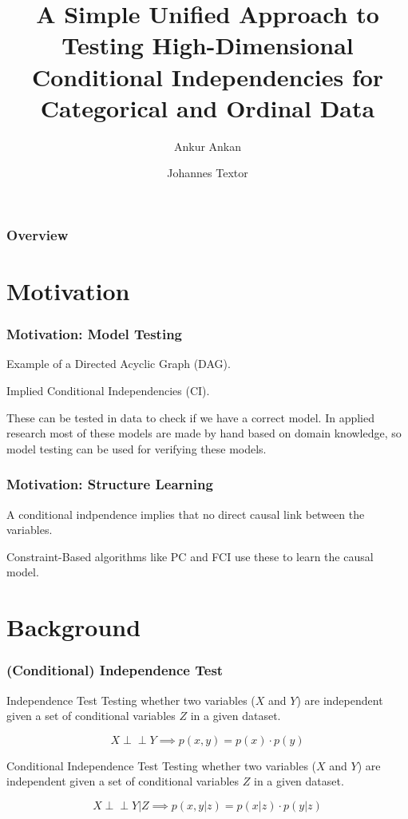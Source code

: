 \documentclass{beamer}
\def\ci{\perp\!\!\!\!\!\perp}
\begin{document}
\title{A Simple Unified Approach to Testing High-Dimensional Conditional
Independencies for Categorical and Ordinal Data}
\author {Ankur Ankan \and Johannes Textor}
\date{}
\maketitle

\begin{frame}
	\frametitle{Overview}
	\tableofcontents
\end{frame}

\section{Motivation}
\begin{frame}
	\frametitle{Motivation: Model Testing}
	Example of a Directed Acyclic Graph (DAG).

	Implied Conditional Independencies (CI).

	These can be tested in data to check if we have a correct model.
	In applied research most of these models are made by hand based on
	domain knowledge, so model testing can be used for verifying these models.	
\end{frame}

\begin{frame}
	\frametitle{Motivation: Structure Learning}

	A conditional indpendence implies that no direct causal link between the 
	variables.

	Constraint-Based algorithms like PC and FCI use these to learn the causal
	model.
\end{frame}

\section{Background}
\begin{frame}
	\frametitle{(Conditional) Independence Test}
	\begin{block}{Independence Test}
	Testing whether two variables ($ X $ and $ Y $) are independent given a
	set of conditional variables $ Z $ in a given dataset. 

	$$ X \ci Y \implies p(x, y) = p(x) \cdot p(y) $$
	\end{block}

	\begin{block}{Conditional Independence Test}	
	Testing whether two variables ($ X $ and $ Y $) are independent given a
	set of conditional variables $ Z $ in a given dataset. 

	$$ X \ci Y | Z \implies p(x, y | z) = p(x | z) \cdot p(y | z) $$
	\end{block}
\end{frame}
\end{document}
